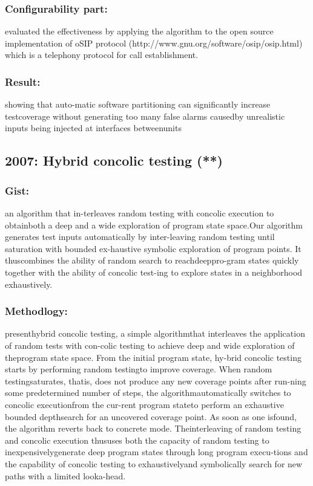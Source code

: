 \documentclass[	runningheads,
				a4paper]{llncs}
\begin{document}
\subsubsection{Configurability part:}
evaluated the effectiveness by applying the algorithm to the open source implementation of oSIP protocol (http://www.gnu.org/software/osip/osip.html) which is a telephony protocol for call establishment. 


\subsubsection{Result:}
showing  that  auto-matic  software  partitioning  can  significantly  increase  testcoverage without generating too many false alarms causedby unrealistic inputs being injected at interfaces betweenunits

\subsection{2007: Hybrid concolic testing (**)}

\subsubsection{Gist:}
an algorithm that in-terleaves random testing with concolic execution to obtainboth a deep and a wide exploration of program state space.Our algorithm generates test inputs automatically by inter-leaving  random  testing  until  saturation  with  bounded  ex-haustive  symbolic  exploration  of  program  points.   It  thuscombines the ability of random search to reachdeeppro-gram states quickly together with the ability of concolic test-ing to explore states in a neighborhood exhaustively. 

\subsubsection{Methodlogy:}
presenthybrid concolic testing, a simple algorithmthat  interleaves  the  application  of  random  tests  with  con-colic  testing  to  achieve  deep  and  wide  exploration  of  theprogram  state  space.   From  the  initial  program  state,  hy-brid  concolic  testing  starts  by  performing  random  testingto improve coverage.  When random testingsaturates, thatis,  does  not  produce  any  new  coverage  points  after  run-ning  some  predetermined  number  of  steps,  the  algorithmautomatically switches to concolic executionfrom the cur-rent program stateto perform an exhaustive bounded depthsearch for an uncovered coverage point.  As soon as one isfound,  the algorithm reverts back to concrete mode.   Theinterleaving of random testing and concolic execution thususes both the capacity of random testing to inexpensivelygenerate deep program states through long program execu-tions and the capability of concolic testing to exhaustivelyand symbolically search for new paths with a limited looka-head.
\end{document}
